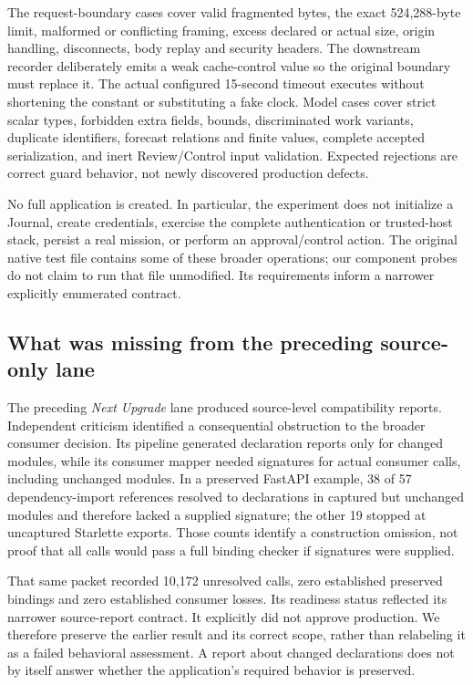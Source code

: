 \documentclass[11pt,a4paper]{article}
\begin{document}
The request-boundary cases cover valid fragmented bytes, the exact 524,288-byte limit, malformed or conflicting framing, excess declared or actual size, origin handling, disconnects, body replay and security headers. The downstream recorder deliberately emits a weak cache-control value so the original boundary must replace it. The actual configured 15-second timeout executes without shortening the constant or substituting a fake clock. Model cases cover strict scalar types, forbidden extra fields, bounds, discriminated work variants, duplicate identifiers, forecast relations and finite values, complete accepted serialization, and inert Review/Control input validation. Expected rejections are correct guard behavior, not newly discovered production defects.\cite{contract}

No full application is created. In particular, the experiment does not initialize a Journal, create credentials, exercise the complete authentication or trusted-host stack, persist a real mission, or perform an approval/control action. The original native test file contains some of these broader operations; our component probes do not claim to run that file unmodified. Its requirements inform a narrower explicitly enumerated contract.\cite{consumer,contract,criticism}

\subsection{What was missing from the preceding source-only lane}

The preceding \emph{Next Upgrade} lane produced source-level compatibility reports. Independent criticism identified a consequential obstruction to the broader consumer decision. Its pipeline generated declaration reports only for changed modules, while its consumer mapper needed signatures for actual consumer calls, including unchanged modules. In a preserved FastAPI example, 38 of 57 dependency-import references resolved to declarations in captured but unchanged modules and therefore lacked a supplied signature; the other 19 stopped at uncaptured Starlette exports. Those counts identify a construction omission, not proof that all calls would pass a full binding checker if signatures were supplied.\cite{criticism,nextupgrade}

That same packet recorded 10,172 unresolved calls, zero established preserved bindings and zero established consumer losses. Its readiness status reflected its narrower source-report contract. It explicitly did not approve production. We therefore preserve the earlier result and its correct scope, rather than relabeling it as a failed behavioral assessment. A report about changed declarations does not by itself answer whether the application's required behavior is preserved.\cite{criticism}
\end{document}
